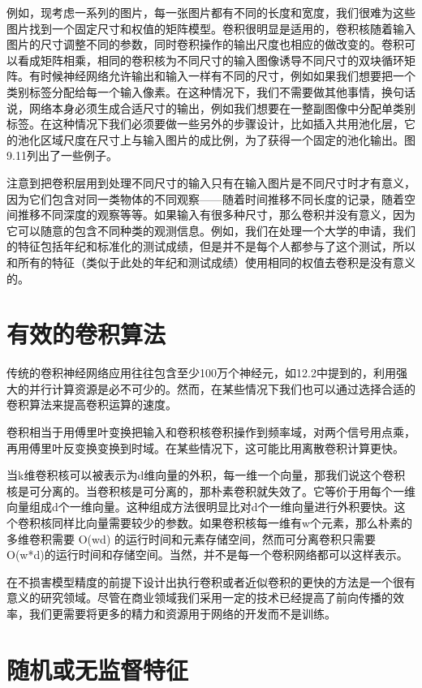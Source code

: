  
例如，现考虑一系列的图片，每一张图片都有不同的长度和宽度，我们很难为这些图片找到一个固定尺寸和权值的矩阵模型。卷积很明显是适用的，卷积核随着输入图片的尺寸调整不同的参数，同时卷积操作的输出尺度也相应的做改变的。卷积可以看成矩阵相乘，相同的卷积核为不同尺寸的输入图像诱导不同尺寸的双块循环矩阵。有时候神经网络允许输出和输入一样有不同的尺寸，例如如果我们想要把一个类别标签分配给每一个输入像素。在这种情况下，我们不需要做其他事情，换句话说，网络本身必须生成合适尺寸的输出，例如我们想要在一整副图像中分配单类别标签。在这种情况下我们必须要做一些另外的步骤设计，比如插入共用池化层，它的池化区域尺度在尺寸上与输入图片的成比例，为了获得一个固定的池化输出。图9.11列出了一些例子。

注意到把卷积层用到处理不同尺寸的输入只有在输入图片是不同尺寸时才有意义，因为它们包含对同一类物体的不同观察——随着时间推移不同长度的记录，随着空间推移不同深度的观察等等。如果输入有很多种尺寸，那么卷积并没有意义，因为它可以随意的包含不同种类的观测信息。例如，我们在处理一个大学的申请，我们的特征包括年纪和标准化的测试成绩，但是并不是每个人都参与了这个测试，所以和所有的特征（类似于此处的年纪和测试成绩）使用相同的权值去卷积是没有意义的。


\section{有效的卷积算法}
\label{sec:9.8}
 传统的卷积神经网络应用往往包含至少100万个神经元，如12.2中提到的，利用强大的并行计算资源是必不可少的。然而，在某些情况下我们也可以通过选择合适的卷积算法来提高卷积运算的速度。

   卷积相当于用傅里叶变换把输入和卷积核卷积操作到频率域，对两个信号用点乘，再用傅里叶反变换变换到时域。在某些情况下，这可能比用离散卷积计算更快。

   当k维卷积核可以被表示为d维向量的外积，每一维一个向量，那我们说这个卷积核是可分离的。当卷积核是可分离的，那朴素卷积就失效了。它等价于用每个一维向量组成d个一维向量。这种组成方法很明显比对d个一维向量进行外积要快。这个卷积核同样比向量需要较少的参数。如果卷积核每一维有w个元素，那么朴素的多维卷积需要 O(wd) 的运行时间和元素存储空间，然而可分离卷积只需要 O(w*d)的运行时间和存储空间。当然，并不是每一个卷积网络都可以这样表示。
   
   在不损害模型精度的前提下设计出执行卷积或者近似卷积的更快的方法是一个很有意义的研究领域。尽管在商业领域我们采用一定的技术已经提高了前向传播的效率，我们更需要将更多的精力和资源用于网络的开发而不是训练。
   
   
   
\section{随机或无监督特征}
\label{sec:9.9}

